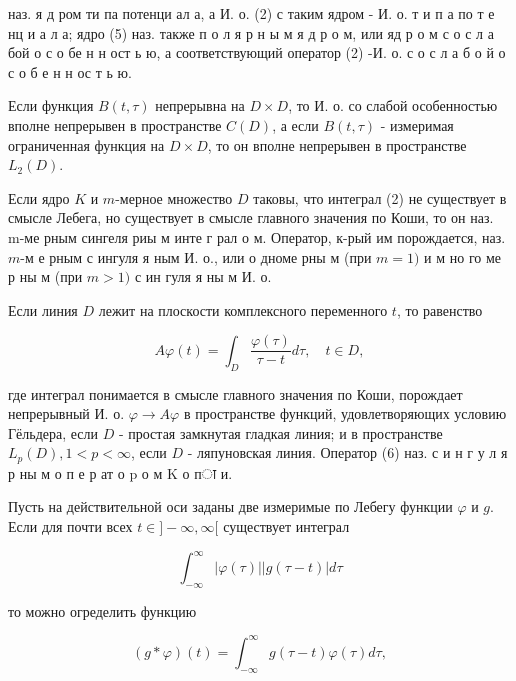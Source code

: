 \documentclass[10pt]{article}
\begin{document}
наз. я д ром ти па потенци ал а, а И. о. (2) с таким ядром - И. о. т и п а по т е нц и а л а; ядро (5) наз. также п о л я р н ы м я д р о м, или яд р о м с о с л а бой о с о бе н н ост ь ю, а соответствующий оператор (2) -И. о. с о с л а б о й о с о б е н н ос т ь ю.



Если функция $B(t, \tau)$ непрерывна на $D \times D$, то И. о. со слабой особенностью вполне непрерывен в пространстве $C(D)$, а если $B(t, \tau)$ - измеримая ограниченная функция на $D \times D$, то он вполне непрерывен в пространстве $L_{2}(D)$.



Если ядро $K$ и $m$-мерное множество $D$ таковы, что интеграл (2) не существует в смысле Лебега, но существует в смысле главного значения по Коши, то он наз. m-ме рным сингеля риы м инте г рал о м. Оператор, к-рый им порождается, наз. $m$-м е рным с ингуля я ным И. о., или о дноме рны м (при $m=1)$ и м но го ме р ны м (при $m>1)$ с ин гуля я ны м И. о.



Если линия $D$ лежит на плоскости комплексного переменного $t$, то равенство



\[

A \varphi(t)=\int_{D} \frac{\varphi(\tau)}{\tau-t} d \tau, \quad t \in D,

\]



где интеграл понимается в смысле главного значения по Коши, порождает непрерывный И. о. $\varphi \rightarrow A \varphi$ в пространстве функций, удовлетворяющих условию Гёльдера, если $D$ - простая замкнутая гладкая линия; и в пространстве $L_{p}(D), 1<p<\infty$, если $D$ - ляпуновская линия. Оператор (6) наз. с и н г у л я р ны м о п е р ат о $\mathrm{p}$ о м K о пा и.



Пусть на действительной оси заданы две измеримые по Лебегу функции $\varphi$ и $g$. Если для почти всех $t \in]-\infty, \infty[$ существует интеграл



\[

\int_{-\infty}^{\infty}|\varphi(\tau)||g(\tau-t)| d \tau

\]



то можно огределить функцию



\[

(g * \varphi)(t)=\int_{-\infty}^{\infty} g(\tau-t) \varphi(\tau) d \tau,

\]
\end{document}
